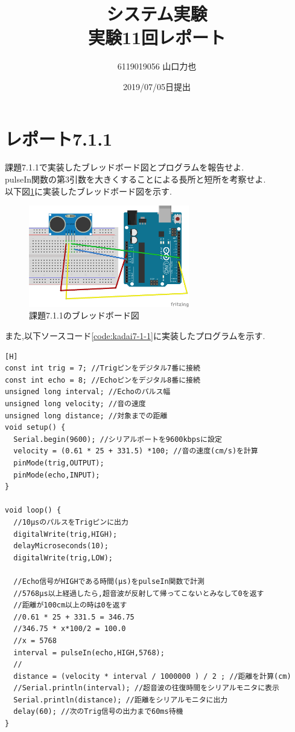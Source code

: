 \documentclass{jarticle}
\title{{システム実験}\\実験11回レポート}
\author{6119019056 山口力也}
\date{2019/07/05日提出}
\begin{document}
\maketitle
\section{レポート7.1.1}
課題7.1.1で実装したブレッドボード図とプログラムを報告せよ. \\
pulseIn関数の第3引数を大きくすることによる長所と短所を考察せよ. \\

以下図\ref{fig:kadai7-1-1}に実装したブレッドボード図を示す.

\begin{figure}[H]
\begin{center}
\includegraphics[width=7.0cm]{images/kadai7-1-1.png}
\caption{課題7.1.1のブレッドボード図}
\label{fig:kadai7-1-1}
\end{center}
\end{figure}

また,以下ソースコード\ref{code:kadai7-1-1}に実装したプログラムを示す.

\begin{lstlisting}[caption = 課題7.1.1,label=code:kadai7-1-1][H]
const int trig = 7; //Trigピンをデジタル7番に接続
const int echo = 8; //Echoピンをデジタル8番に接続
unsigned long interval; //Echoのパルス幅
unsigned long velocity; //音の速度
unsigned long distance; //対象までの距離
void setup() {
  Serial.begin(9600); //シリアルポートを9600kbpsに設定
  velocity = (0.61 * 25 + 331.5) *100; //音の速度(cm/s)を計算
  pinMode(trig,OUTPUT);
  pinMode(echo,INPUT);
}

void loop() {
  //10μsのパルスをTrigピンに出力
  digitalWrite(trig,HIGH);
  delayMicroseconds(10);
  digitalWrite(trig,LOW);

  //Echo信号がHIGHである時間(μs)をpulseIn関数で計測
  //5768μs以上経過したら,超音波が反射して帰ってこないとみなして0を返す
  //距離が100cm以上の時は0を返す
  //0.61 * 25 + 331.5 = 346.75
  //346.75 * x*100/2 = 100.0
  //x = 5768 
  interval = pulseIn(echo,HIGH,5768); 
  //
  distance = (velocity * interval / 1000000 ) / 2 ; //距離を計算(cm)
  //Serial.println(interval); //超音波の往復時間をシリアルモニタに表示
  Serial.println(distance); //距離をシリアルモニタに出力
  delay(60); //次のTrig信号の出力まで60ms待機
}
\end{lstlisting}
\end{document}
